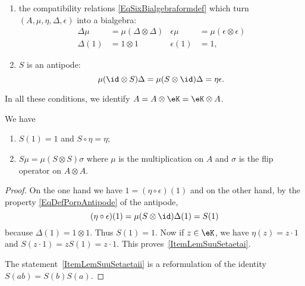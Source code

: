 \begin{definition}
\begin{enumerate}
		\item
		      the compatibility relations \eqref{EqSixBialgebraformdef} which turn \( (A,\mu,\eta,\Delta,\epsilon)\) into a bialgebra:
		      \begin{subequations}
			      \begin{align}
				      \Delta\mu & =\mu(\Delta\otimes\Delta) & \epsilon\mu & =\mu(\epsilon\otimes\epsilon) \\
				      \Delta(1) & =1\otimes 1               & \epsilon(1) & =1,
			      \end{align}
		      \end{subequations}
		\item
		      \( S\) is an antipode:
		      \begin{equation}        \label{EqDefPorpAntipode}
			      \mu(\id\otimes S)\Delta=\mu(S\otimes\id)\Delta=\eta\epsilon.
		      \end{equation}
	\end{enumerate}
	In all these conditions, we identify \( A=A\otimes \eK=\eK\otimes A\).
\end{definition}

\begin{lemma}       \label{LemSuuSetaeta}
	We have
	\begin{enumerate}
		\item       \label{ItemLemSuuSetaetai}
		      \( S(1)=1\) and \( S\circ\eta=\eta\);
		\item       \label{ItemLemSuuSetaetaii}
		      \( S\mu=\mu(S\otimes S)\sigma\) where \( \mu\) is the multiplication on \( A\) and \( \sigma\) is the flip operator on \( A\otimes A\).
	\end{enumerate}

\end{lemma}

\begin{proof}
	On the one hand we have \( 1=(\eta\circ\epsilon)(1)\) and on the other hand, by the property \eqref{EqDefPorpAntipode} of the antipode,
	\begin{equation}
		(\eta\circ\epsilon)(1)=\mu(S\otimes \id)\Delta(1)=S(1)
	\end{equation}
	because \( \Delta(1)=1\otimes 1\). Thus \( S(1)=1\). Now if \( z\in\eK\), we have \( \eta(z)=z\cdot 1 \) and \( S(z\cdot 1)=zS(1)=z\cdot 1\). This proves~\ref{ItemLemSuuSetaetai}.

	The statement~\ref{ItemLemSuuSetaetaii} is a reformulation of the identity \( S(ab)=S(b)S(a)\).
\end{proof}

